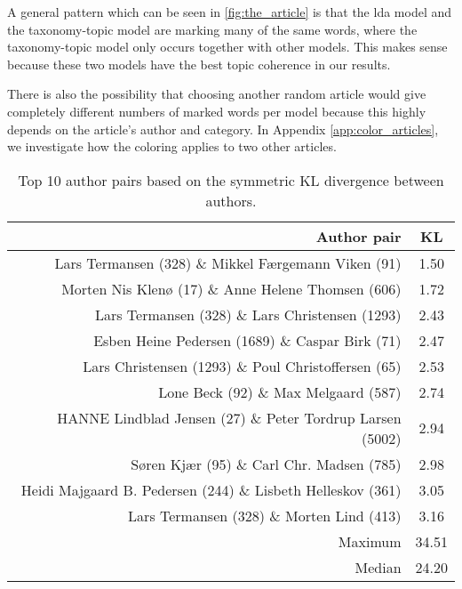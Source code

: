 A general pattern which can be seen in \autoref{fig:the_article} is that the \gls{lda} model and the taxonomy-topic model are marking many of the same words, where the taxonomy-topic model only occurs together with other models.
This makes sense because these two models have the best topic coherence in our results. 

There is also the possibility that choosing another random article would give completely different numbers of marked words per model because this highly depends on the article's author and category.
In Appendix \autoref{app:color_articles}, we investigate how the coloring applies to two other articles.

\begin{table}[t]
	\centering
	\caption{Top 10 author pairs based on the symmetric KL divergence between authors.}
	\begin{tabular}{r|c}
		Author pair & KL \\
		\midrule
		Lars Termansen (328) \& Mikkel Færgemann Viken (91) & 1.50 \\
		Morten Nis Klenø (17) \& Anne Helene Thomsen (606) & 1.72 \\
		Lars Termansen (328) \& Lars Christensen (1293) & 2.43 \\
		Esben Heine Pedersen (1689) \& Caspar Birk (71) & 2.47 \\
		Lars Christensen (1293) \& Poul Christoffersen (65) & 2.53 \\
		Lone Beck (92) \& Max Melgaard (587) & 2.74 \\
		HANNE Lindblad Jensen (27) \& Peter Tordrup Larsen (5002) & 2.94 \\
		Søren Kjær (95) \& Carl Chr. Madsen (785) & 2.98 \\
		Heidi Majgaard B. Pedersen (244) \& Lisbeth Helleskov (361) & 3.05 \\
		Lars Termansen (328) \& Morten Lind (413) & 3.16 \\
		\midrule
		Maximum & 34.51 \\
		Median & 24.20 \\
	\end{tabular}
	\label{tab:author_similarity}
\end{table}




